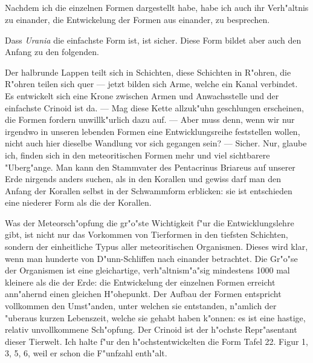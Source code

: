 \documentclass[a4paper, 11pt, oneside]{article}
\begin{document}
\subsection{}
\paragraph{}
Nachdem ich die einzelnen Formen dargestellt habe, habe ich auch ihr Verh"altnis zu einander, die Entwickelung der Formen aus einander, zu besprechen.

Dass \emph{Urania} die einfachste Form ist, ist sicher. Diese Form bildet aber auch den Anfang zu den folgenden.

Der halbrunde Lappen teilt sich in Schichten, diese Schichten in R"ohren, die R"ohren teilen sich quer --- jetzt bilden sich Arme, welche ein Kanal verbindet. Es entwickelt sich eine Krone zwischen Armen und Anwachsstelle und der einfachste Crinoid ist da. --- Mag diese Kette allzuk"uhn geschlungen erscheinen, die Formen fordern unwillk"urlich dazu auf. --- Aber muss denn, wenn wir nur irgendwo in unseren lebenden Formen eine Entwicklungsreihe feststellen wollen, nicht auch hier dieselbe Wandlung vor sich gegangen sein? --- Sicher. Nur, glaube ich, finden sich in den meteoritischen Formen mehr und viel sichtbarere "Uberg"ange. Man kann den Stammvater des Pentacrinus Briareus auf unserer Erde nirgends anders suchen, als in den Korallen und gewiss darf man den Anfang der Korallen selbst in der Schwammform erblicken: sie ist entschieden eine niederer Form als die der Korallen.

Was der Meteorsch"opfung die gr"o"ste Wichtigkeit f"ur die Entwicklungslehre gibt, ist nicht nur das Vorkommen von Tierformen in den tiefsten Schichten, sondern der einheitliche Typus aller meteoritischen Organismen. Dieses wird klar, wenn man hunderte von D"unn-Schliffen nach einander betrachtet. Die Gr"o"se der Organismen ist eine gleichartige, verh"altnism"a"sig mindestens 1000 mal kleinere als die der Erde: die Entwickelung der einzelnen Formen erreicht ann"ahernd einen gleichen H"ohepunkt. Der Aufbau der Formen entspricht vollkommen den Umst"anden, unter welchen sie entstanden, n"amlich der "uberaus kurzen Lebenszeit, welche sie gehabt haben k"onnen: es ist eine hastige, relativ unvollkommene Sch"opfung. Der Crinoid ist der h"ochste Repr"asentant dieser Tierwelt. Ich halte f"ur den h"ochstentwickelten die Form Tafel 22. Figur 1, 3, 5, 6, weil er schon die F"unfzahl enth"alt.
\end{document}
